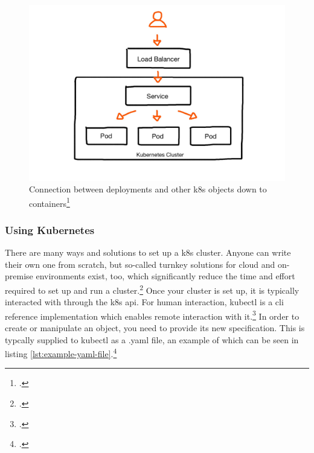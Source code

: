 \begin{figure}
\includegraphics[scale=0.2]{pictures/loadbalancer.JPG} 
\caption{Connection between deployments and other \gls{k8s} objects down to containers\protect\footcite{nicoPictures}}
\label{fig:loadbalancer}
\end{figure}


\subsubsection{Using Kubernetes}
There are many ways and solutions to set up a \gls{k8s} cluster. Anyone can write their own one from scratch, but so-called turnkey solutions for cloud and on-premise environments exist, too, which significantly reduce the time and effort required to set up and run a cluster.\footcite[][, sections 'Turnkey Cloud Solutions' and 'On-Premises turnkey cloud solutions']{turnkey}
Once your cluster is set up, it is typically interacted with through the \gls{k8s} \gls{api}. For human interaction, kubectl is a \gls{cli} reference implementation which enables remote interaction with it.\footcite[][, section 'The Kubernetes API']{k8sApi}
In order to create or manipulate an object, you need to provide its new specification. This is typcally supplied to kubectl as a .yaml file, an example of which can be seen in listing \ref{lst:example-yaml-file}.\footcite[][, section 'Describing a Kubernetes Object']{k8sObjects}

